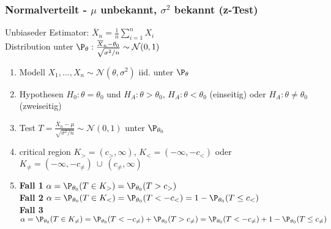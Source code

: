 \subsubsection*{\texorpdfstring{Normalverteilt - \(\mu\) unbekannt, \(\sigma^2\) bekannt (z-Test)}{Normalverteilt - μ unbekannt, σ² bekannt (z-Test)}}
Unbiaseder Estimator: \(\overline{X}_n = \frac{1}{n} \sum_{i=1}^n X_i\)\\
Distribution unter \(\P_\theta: \frac{\overline{X}_n - \theta_0}{\sqrt{\sigma^2/n}} \sim \mathcal{N}(0,1)\)
\begin{enumerate}
	\item Modell \(X_1, \ldots, X_n \sim \mathcal{N}(\theta, \sigma^2)\) iid. unter \(\P_\theta\)
	\item Hypothesen \(H_0 : \theta = \theta_0\) und \(H_A : \theta > \theta_0\), \(H_A : \theta < \theta_0\) (einseitig) oder \(H_A : \theta \ne \theta_0\) (zweiseitig)
	\item Test \(T = \frac{\overline{X}_n - \mu}{\sqrt{\sigma^2/n}} \sim \mathcal{N}(0,1)\) unter \(\P_{\theta_0}\)
	\item critical region \(K_{>} = (c_{>}, \infty)\), \(K_{<} = (-\infty, -c_{<})\) oder \(K_{\neq} = (-\infty, -c_{\neq}) \ \cup \ (c_{\neq}, \infty)\)
	\item \textbf{Fall 1} \(\alpha = \P_{\theta_0}(T \in K_>) = \P_{\theta_0}(T > c_>)\)\\
	\textbf{Fall 2} \(\alpha = \P_{\theta_0}(T \in K_<) = \P_{\theta_0}(T < -c_<) = 1 - \P_{\theta_0}(T \leq c_<)\)\\
	\textbf{Fall 3} \(\alpha = \P_{\theta_0}(T \in K_{\neq}) = \P_{\theta_0}(T < -c_{\neq}) + \P_{\theta_0}(T > c_{\neq}) = \P_{\theta_0}(T < -c_{\neq}) + 1 - \P_{\theta_0}(T \leq c_{\neq})\)
\end{enumerate}

